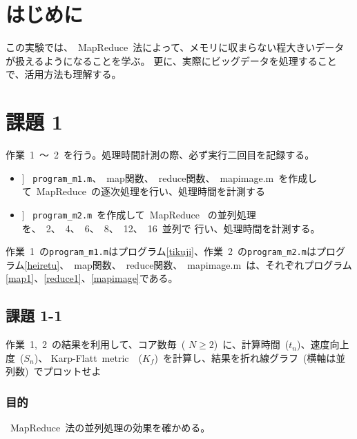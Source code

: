 \documentclass[10pt]{jarticle}
\title{\framebox{\hspace{4zw}データ科学 レポート3%
                 \hspace{4zw}}}
\author{神野 友哉 \\
        2022311042  \\
        愛知県立大学 情報科学部 情報科学科 \\}
\date{2023年12月17日}
\begin{document}
\maketitle
\tableofcontents
\clearpage

\section{はじめに}
%
この実験では、\ MapReduce\ 法によって、メモリに収まらない程大きいデータが扱えるようになることを学ぶ。
更に、実際にビッグデータを処理することで、活用方法も理解する。

%
\section{課題 1}
%

作業\ 1\ ～\ 2\ を行う。処理時間計測の際、必ず実行二回目を記録する。
\begin{itemize}[left=30pt]
\item[[作業1]] \ \verb|program_m1.m|、\ map関数、\ reduce関数、\ mapimage.m\ を作成して\ MapReduce\ の逐次処理を行い、処理時間を計測する
\item[[作業2]] \ \verb|program_m2.m|\ を作成して\ MapReduce \ の並列処理を、\ 2、\ 4、\ 6、\ 8、\ 12、\ 16\ 並列で
行い、処理時間を計測する。
\end{itemize}
作業\ 1\ の\verb|program_m1.m|はプログラム\ref{tikuji}、作業\ 2\ の\verb|program_m2.m|はプログラム\ref{heiretu}、\ map関数、\ reduce関数、\ mapimage.m\
は、それぞれプログラム\ref{map1}、\ref{reduce1}、\ref{mapimage}である。





%

\subsection{課題 1-1}
	作業\ 1,\ 2\ の結果を利用して、コア数毎\ ( $N\ge 2$)\ に、計算時間\ ($t_{n}$)、速度向上度\ ($S_{n}$)、
	Karp-Flatt\ metric\ \ ($K_{f}$)\ を計算し、結果を折れ線グラフ\ (横軸は並列数)\ でプロットせよ
\subsubsection{目的}
%
\ MapReduce\ 法の並列処理の効果を確かめる。
%
\end{document}
